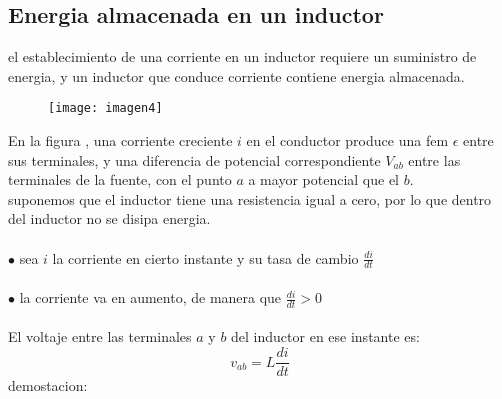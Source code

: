 \documentclass[13pt,twoside]{article}
\begin{document}
 \subsection{ Energia almacenada en un inductor}
 el establecimiento de una corriente en un inductor requiere un suministro de energia, y un inductor que conduce corriente contiene energia almacenada.  
 
 \begin{figure}[htb]
\centering
   \texttt{[image: imagen4]}
  \caption{}
  \label{} 
\end{figure}

En la figura , una corriente creciente $i$ en el conductor produce una fem 
 $\epsilon$ entre sus terminales, y una diferencia de potencial correspondiente $V_{ab}$ entre las terminales de la fuente, con el punto $a$ a mayor potencial que el $b$.\\
 suponemos que el inductor tiene una resistencia igual a cero, por lo que dentro del inductor no se disipa energia.\\
 \\
 $\bullet$ sea $i$ la corriente en cierto instante y su tasa de cambio $\frac{di}{dt}$\\
 \\
 $\bullet$ la corriente va en aumento, de manera que $\frac{di}{dt}>0$\\
 \\
 El voltaje entre las terminales $a$ y $b$ del inductor en ese instante es:
 \begin{equation}
 \displaystyle v_{ab}=L\frac{di}{dt}
\end{equation}
demostacion:
 
\end{document}
